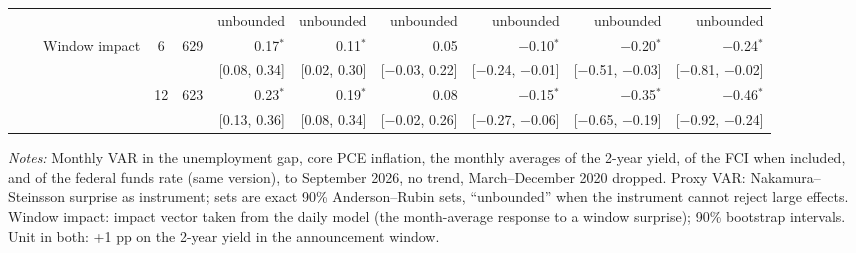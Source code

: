 \begin{longtable}{lllcrrrrrrr}
 & & & & & {\tiny unbounded} & {\tiny unbounded} & {\tiny unbounded} & {\tiny unbounded} & {\tiny unbounded} & {\tiny unbounded}\\
 &  & Window impact & 6 & 629 & 0.17$^{*}$ & 0.11$^{*}$ & 0.05 & $-$0.10$^{*}$ & $-$0.20$^{*}$ & $-$0.24$^{*}$\\
 & & & & & {\tiny [0.08, 0.34]} & {\tiny [0.02, 0.30]} & {\tiny [$-$0.03, 0.22]} & {\tiny [$-$0.24, $-$0.01]} & {\tiny [$-$0.51, $-$0.03]} & {\tiny [$-$0.81, $-$0.02]}\\
 &  &  & 12 & 623 & 0.23$^{*}$ & 0.19$^{*}$ & 0.08 & $-$0.15$^{*}$ & $-$0.35$^{*}$ & $-$0.46$^{*}$\\
 & & & & & {\tiny [0.13, 0.36]} & {\tiny [0.08, 0.34]} & {\tiny [$-$0.02, 0.26]} & {\tiny [$-$0.27, $-$0.06]} & {\tiny [$-$0.65, $-$0.19]} & {\tiny [$-$0.92, $-$0.24]}\\
\end{longtable}
\begin{flushleft}\footnotesize\textit{Notes:} Monthly VAR in the unemployment gap, core PCE inflation, the monthly averages of the 2-year yield, of the FCI when included, and of the federal funds rate (same version), to September 2026, no trend, March--December 2020 dropped. Proxy VAR: Nakamura--Steinsson surprise as instrument; sets are exact 90\% Anderson--Rubin sets, ``unbounded'' when the instrument cannot reject large effects. Window impact: impact vector taken from the daily model (the month-average response to a window surprise); 90\% bootstrap intervals. Unit in both: +1 pp on the 2-year yield in the announcement window.\end{flushleft}
\endgroup
